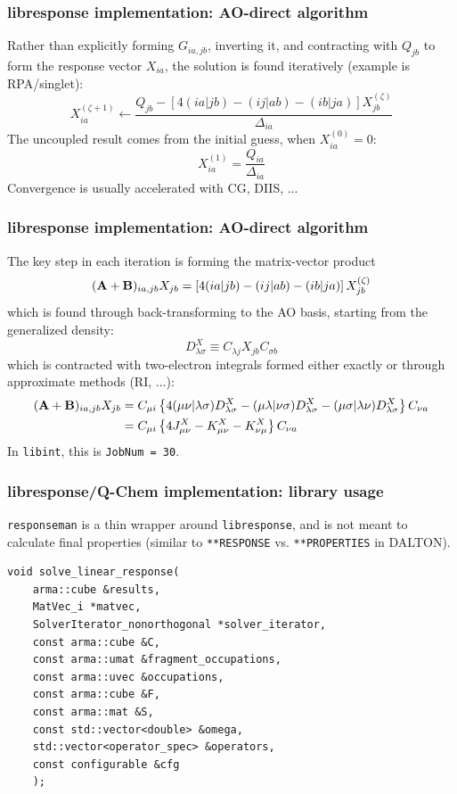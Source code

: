 \documentclass[%
    xcolor=usenames,dvipsnames,svgnames%
]{beamer}
\begin{document}
\begin{frame}
  \frametitle{libresponse implementation: AO-direct algorithm}
  Rather than explicitly forming \(G_{ia,jb}\), inverting it, and contracting with \(Q_{jb}\) to form the response vector \(X_{ia}\), the solution is found iteratively (example is RPA/singlet):
  \begin{equation*}
    X_{ia}^{(\zeta+1)} \leftarrow \frac{Q_{jb} - \left[4(ia|jb) - (ij|ab) - (ib|ja)\right] X_{jb}^{(\zeta)}}{\Delta_{ia}}
  \end{equation*}
  The uncoupled result comes from the initial guess, when \(X_{ia}^{(0)} = 0\):
  \begin{equation*}
    X_{ia}^{(1)} = \frac{Q_{ia}}{\Delta_{ia}}
  \end{equation*}
  Convergence is usually accelerated with CG, DIIS, ...
\end{frame}

\begin{frame}
  \frametitle{libresponse implementation: AO-direct algorithm}
  \scriptsize
  The key step in each iteration is forming the matrix-vector product
  \begin{equation*}
    (\boldsymbol{\mathbf{A}}+\boldsymbol{\mathbf{B}})_{ia,jb}X_{jb} = \left[4(ia|jb) - (ij|ab) - (ib|ja)\right] X_{jb}^{(\zeta)}
  \end{equation*}
  which is found through back-transforming to the AO basis, starting from the generalized density:
  \begin{equation*}
    D_{\lambda\sigma}^{X} \equiv C_{\lambda j} X_{jb} C_{\sigma b}
  \end{equation*}
  which is contracted with two-electron integrals formed either exactly or through approximate methods (RI, ...):
  \begin{align*}
    (\boldsymbol{\mathbf{A}}+\boldsymbol{\mathbf{B}})_{ia,jb}X_{jb} &= C_{\mu i} \left\{ 4(\mu\nu|\lambda\sigma)D_{\lambda\sigma}^{X} - (\mu\lambda|\nu\sigma)D_{\lambda\sigma}^{X} - (\mu\sigma|\lambda\nu)D_{\lambda\sigma}^{X} \right\} C_{\nu a} \\
    &= C_{\mu i} \left\{ 4J_{\mu\nu}^{X} - K_{\mu\nu}^{X} - K_{\nu\mu}^{X} \right\} C_{\nu a}
  \end{align*}
  In \texttt{libint}, this is \texttt{JobNum = 30}.
\end{frame}

\begin{frame}[fragile]
  \frametitle{libresponse/Q-Chem implementation: library usage}
  \texttt{responseman} is a thin wrapper around \texttt{libresponse}, and is not meant to calculate final properties (similar to \texttt{**RESPONSE} vs. \texttt{**PROPERTIES} in DALTON). \\
  \begin{verbatim}
void solve_linear_response(
    arma::cube &results,
    MatVec_i *matvec,
    SolverIterator_nonorthogonal *solver_iterator,
    const arma::cube &C,
    const arma::umat &fragment_occupations,
    const arma::uvec &occupations,
    const arma::cube &F,
    const arma::mat &S,
    const std::vector<double> &omega,
    std::vector<operator_spec> &operators,
    const configurable &cfg
    );
  \end{verbatim}
\end{frame}
\end{document}
